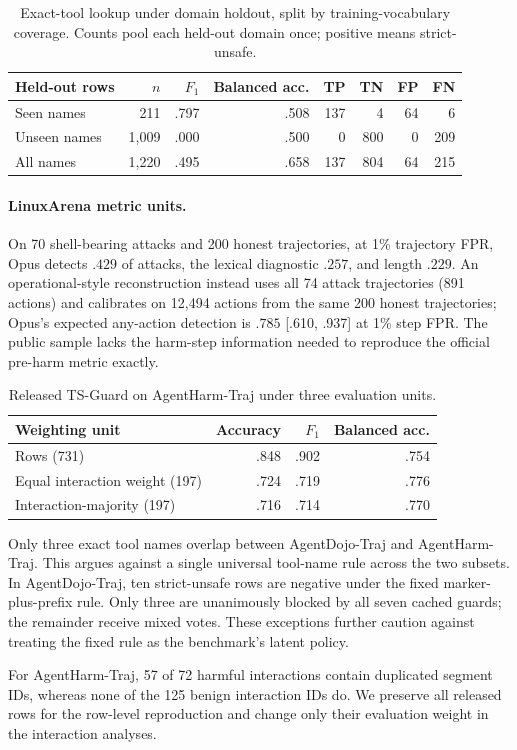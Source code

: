 \documentclass{article}
\newcommand{\ci}[2]{[#1, #2]}
\begin{document}
\begin{table}[h]
\caption{Exact-tool lookup under domain holdout, split by training-vocabulary
coverage.  Counts pool each held-out domain once; positive means strict-unsafe.}
\label{tab:lookup-coverage}
\centering
\small
\begin{tabular}{lrrrrrrr}
\toprule
Held-out rows & $n$ & $F_1$ & Balanced acc. & TP & TN & FP & FN \\
\midrule
Seen names & 211 & .797 & .508 & 137 & 4 & 64 & 6 \\
Unseen names & 1,009 & .000 & .500 & 0 & 800 & 0 & 209 \\
All names & 1,220 & .495 & .658 & 137 & 804 & 64 & 215 \\
\bottomrule
\end{tabular}
\end{table}

\paragraph{LinuxArena metric units.}
On 70 shell-bearing attacks and 200 honest trajectories, at 1\% trajectory FPR,
Opus detects $.429$ of attacks, the lexical diagnostic $.257$, and length $.229$.
An operational-style reconstruction instead uses all 74 attack trajectories (891
actions) and calibrates on 12,494 actions from the same 200 honest trajectories;
Opus's expected any-action detection is $.785$ \ci{.610}{.937} at 1\% step FPR.
The public sample lacks the harm-step information needed to reproduce the official
pre-harm metric exactly.

\begin{table}[h]
\caption{Released TS-Guard on AgentHarm-Traj under three evaluation units.}
\label{tab:weighting}
\centering
\small
\begin{tabular}{lrrr}
\toprule
Weighting unit & Accuracy & $F_1$ & Balanced acc. \\
\midrule
Rows (731) & .848 & .902 & .754 \\
Equal interaction weight (197) & .724 & .719 & .776 \\
Interaction-majority (197) & .716 & .714 & .770 \\
\bottomrule
\end{tabular}
\end{table}

Only three exact tool names overlap between AgentDojo-Traj and AgentHarm-Traj.  This
argues against a single universal tool-name rule across the two subsets.  In
AgentDojo-Traj, ten strict-unsafe rows are negative under the fixed marker-plus-prefix
rule.  Only three are unanimously blocked by all seven cached guards; the remainder
receive mixed votes.  These exceptions further caution against treating the fixed
rule as the benchmark's latent policy.

For AgentHarm-Traj, 57 of 72 harmful interactions contain duplicated segment IDs,
whereas none of the 125 benign interaction IDs do.  We preserve all released rows
for the row-level reproduction and change only their evaluation weight in the
interaction analyses.

% 
\end{document}
